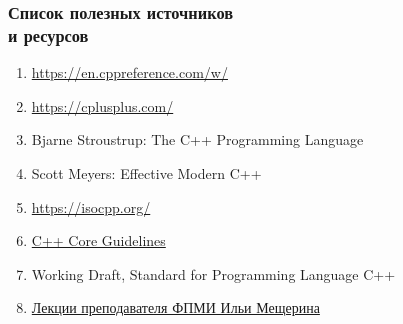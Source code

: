 \documentclass[compress]{beamer}
\begin{document}
\begin{frame}

    \frametitle{Список полезных источников \\ и ресурсов}

    \begin{enumerate}

        \item \url{https://en.cppreference.com/w/}

        \item \url{https://cplusplus.com/}

        \item Bjarne Stroustrup: The C++ Programming Language

        \item Scott Meyers: Effective Modern C++

        \item \url{https://isocpp.org/}

        \item \href{http://isocpp.github.io/CppCoreGuidelines/CppCoreGuidelines}{C++ Core Guidelines}

        \item Working Draft, Standard for Programming Language C++

        \item \href{https://www.youtube.com/@lectory_fpmi}
            {Лекции преподавателя ФПМИ Ильи Мещерина}

    \end{enumerate}

\end{frame}
\end{document}

